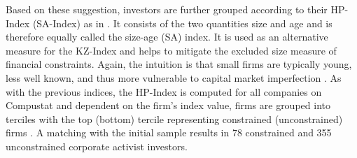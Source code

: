 \documentclass[12pt]{article}
\begin{document}
Based on these suggestion, investors are further grouped according to their HP-Index (SA-Index) as in \citet[p.1929]{hadlock2010}. It consists of the two quantities size and age and is therefore equally called the size-age (SA) index. It is used as an alternative measure for the KZ-Index and helps to mitigate the excluded size measure of financial constraints. Again, the intuition is that small firms are typically young, less well known, and thus more vulnerable to capital market imperfection \citep[p.1790]{Almeida2004}. As with the previous indices, the HP-Index is computed for all companies on Compustat and dependent on the firm's index value, firms are grouped into terciles with the top (bottom) tercile representing constrained (unconstrained) firms \citep[p.29]{Farre-mensa2013}. A matching with the initial sample results in 78 constrained and 355 unconstrained corporate activist investors. 
\end{document}
